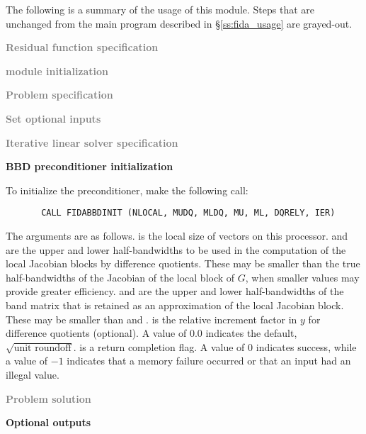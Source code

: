 The following is a summary of the usage of this module. Steps that are unchanged
from the main program described in \S\ref{ss:fida_usage} are grayed-out.

\begin{Steps}
  
\item \textcolor{gray}{\bf Residual function specification}

\item \textcolor{gray}{\bf {\nvector} module initialization}

\item \textcolor{gray}{\bf Problem specification}

\item \textcolor{gray}{\bf Set optional inputs}

\item \textcolor{gray}{\bf Iterative linear solver specification}

\item {\bf BBD preconditioner initialization}

  To initialize the {\idabbdpre} preconditioner, make the following call:
\begin{verbatim}
       CALL FIDABBDINIT (NLOCAL, MUDQ, MLDQ, MU, ML, DQRELY, IER)
\end{verbatim}
  The arguments are as follows.
   is the local size of vectors on this processor.
   and  are the upper and lower half-bandwidths to be used in 
  the computation of the local Jacobian blocks by difference quotients.
  These may be smaller than the true half-bandwidths of the
  Jacobian of the local block of $G$, when smaller values may
  provide greater efficiency.
   and  are the upper and lower half-bandwidths of the band matrix
  that  is retained as an approximation of the local Jacobian block.
  These may be smaller than  and .
   is the relative increment factor in $y$ for difference quotients
  (optional). A value of $0.0$ indicates the default, $\sqrt{\text{unit roundoff}}$.
   is a return completion flag.  A value of $0$ indicates success, while
  a value of $-1$ indicates that a memory failure occurred or that an input had
  an illegal value.

\item \textcolor{gray}{\bf Problem solution}
  
\item {\bf {\idabbdpre} Optional outputs}


\end{Steps}
